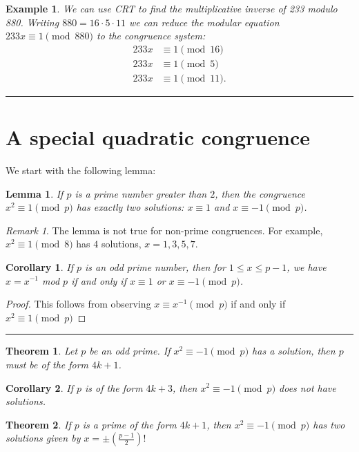 \documentclass[12pt]{article}
\theoremstyle{plain}
\newtheorem{corollary}{Corollary}
\newtheorem{lemma}{Lemma}
\newtheorem{example}{Example}
\newtheorem{theorem}{Theorem}
\theoremstyle{definition}
\theoremstyle{remark}
\newtheorem{remark}{Remark}
\begin{document}
\bigskip
\begin{example}
We can use CRT to find the multiplicative inverse of 233 modulo 880. Writing $880=16\cdot 5\cdot 11$ we can reduce the modular equation $233x\equiv 1 \pmod{880}$ to the congruence system:
\begin{align*}
    233x &\equiv 1 \pmod{16} \\
    233x &\equiv 1 \pmod{5} \\
    233x &\equiv 1 \pmod{11}.
    \end{align*}
\end{example}

\bigskip
\hrule
\section{A special quadratic congruence} 
We start with the following lemma:
\begin{lemma}
If $p$ is a prime number greater than $2$, then the congruence $x^2\equiv 1 \pmod{p}$ has exactly two solutions: $x\equiv 1$ and $x\equiv -1 \pmod{p}$. 
\end{lemma}
\begin{remark}
The lemma is not true for non-prime congruences. For example, $x^2\equiv 1 \pmod{8}$ has $4$ solutions, $x=1, 3, 5, 7$. 
\end{remark}
\begin{corollary}
If $p$ is an odd prime number, then for $1\leq x \leq p-1$, we have $x=x^{-1}$ mod $p$ if and only if $x\equiv 1$ or $x\equiv -1 \pmod{p}$.
\end{corollary}
\begin{proof}
This follows from observing $x\equiv x^{-1} \pmod{p}$ if and only if $x^2\equiv 1 \pmod{p}$
\end{proof}
\hrule



\bigskip
\begin{theorem}
Let $p$ be an odd prime. If $x^2\equiv -1 \pmod{p}$ has a solution, then $p$ must be of the form $4k+1$.
\end{theorem}

\bigskip
\begin{corollary}
If $p$ is of the form $4k+3$, then $x^2\equiv -1 \pmod{p}$ does not have solutions.
\end{corollary}

\begin{theorem}
If $p$ is a prime of the form $4k+1$, then $x^2\equiv -1 \pmod{p}$ has two solutions given by $x=\pm\left( \frac{p-1}{2}\right )!$
\end{theorem}
\end{document}
